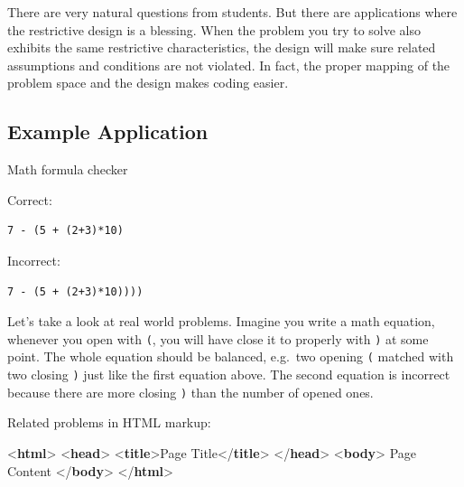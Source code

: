\documentclass[
  letterpaper,
]{scrbook}
\newenvironment{Shaded}{\begin{snugshade}}{\end{snugshade}}
\newcommand{\DataTypeTok}[1]{\textcolor[rgb]{0.68,0.00,0.00}{#1}}
\newcommand{\KeywordTok}[1]{\textcolor[rgb]{0.00,0.23,0.31}{\textbf{#1}}}
\newcommand{\NormalTok}[1]{\textcolor[rgb]{0.00,0.23,0.31}{#1}}
\begin{document}
There are very natural questions from students. But there are
applications where the restrictive design is a blessing. When the
problem you try to solve also exhibits the same restrictive
characteristics, the design will make sure related assumptions and
conditions are not violated. In fact, the proper mapping of the problem
space and the design makes coding easier.

\subsection*{Example Application}\label{example-application}

Math formula checker

Correct:

\begin{verbatim}
7 - (5 + (2+3)*10)
\end{verbatim}

Incorrect:

\begin{verbatim}
7 - (5 + (2+3)*10))))
\end{verbatim}

Let's take a look at real world problems. Imagine you write a math
equation, whenever you open with \texttt{(}, you will have close it to
properly with \texttt{)} at some point. The whole equation should be
balanced, e.g.~two opening \texttt{(} matched with two closing
\texttt{)} just like the first equation above. The second equation is
incorrect because there are more closing \texttt{)} than the number of
opened ones.

Related problems in HTML markup:

\begin{Shaded}
\begin{Highlighting}[]
\DataTypeTok{\textless{}}\KeywordTok{html}\DataTypeTok{\textgreater{}}
    \DataTypeTok{\textless{}}\KeywordTok{head}\DataTypeTok{\textgreater{}}
        \DataTypeTok{\textless{}}\KeywordTok{title}\DataTypeTok{\textgreater{}}\NormalTok{Page Title}\DataTypeTok{\textless{}/}\KeywordTok{title}\DataTypeTok{\textgreater{}}
    \DataTypeTok{\textless{}/}\KeywordTok{head}\DataTypeTok{\textgreater{}}
    \DataTypeTok{\textless{}}\KeywordTok{body}\DataTypeTok{\textgreater{}}
\NormalTok{        Page Content}
    \DataTypeTok{\textless{}/}\KeywordTok{body}\DataTypeTok{\textgreater{}}
\DataTypeTok{\textless{}/}\KeywordTok{html}\DataTypeTok{\textgreater{}}
\end{Highlighting}
\end{Shaded}
\end{document}
